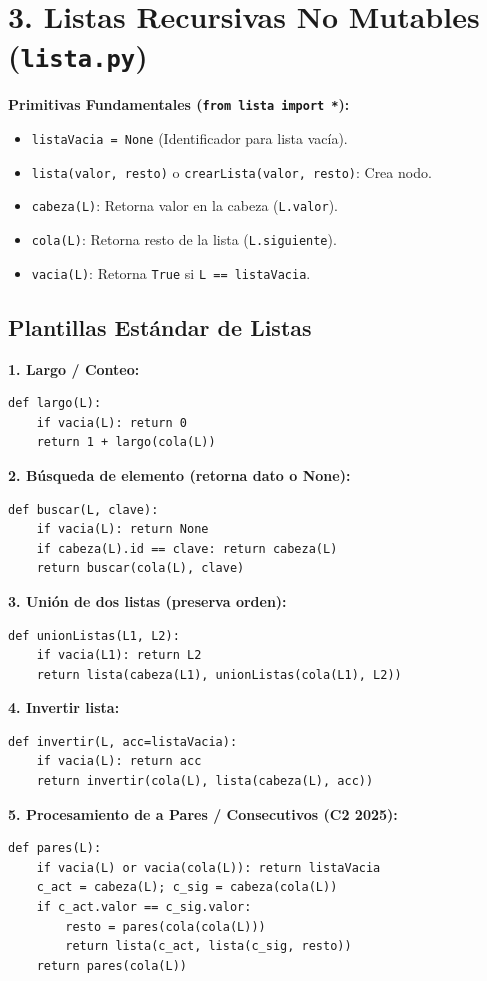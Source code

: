 \documentclass[8pt,twocolumn]{extarticle}
\begin{document}
\section{3. Listas Recursivas No Mutables (\texttt{lista.py})}
\textbf{Primitivas Fundamentales (\texttt{from lista import *}):}
\begin{itemize}
    \item \texttt{listaVacia = None} (Identificador para lista vacía).
    \item \texttt{lista(valor, resto)} o \texttt{crearLista(valor, resto)}: Crea nodo.
    \item \texttt{cabeza(L)}: Retorna valor en la cabeza (\texttt{L.valor}).
    \item \texttt{cola(L)}: Retorna resto de la lista (\texttt{L.siguiente}).
    \item \texttt{vacia(L)}: Retorna \texttt{True} si \texttt{L == listaVacia}.
\end{itemize}

\subsection{Plantillas Estándar de Listas}
\textbf{1. Largo / Conteo:}
\begin{verbatim}
def largo(L):
    if vacia(L): return 0
    return 1 + largo(cola(L))
\end{verbatim}
\textbf{2. Búsqueda de elemento (retorna dato o None):}
\begin{verbatim}
def buscar(L, clave):
    if vacia(L): return None
    if cabeza(L).id == clave: return cabeza(L)
    return buscar(cola(L), clave)
\end{verbatim}
\textbf{3. Unión de dos listas (preserva orden):}
\begin{verbatim}
def unionListas(L1, L2):
    if vacia(L1): return L2
    return lista(cabeza(L1), unionListas(cola(L1), L2))
\end{verbatim}
\textbf{4. Invertir lista:}
\begin{verbatim}
def invertir(L, acc=listaVacia):
    if vacia(L): return acc
    return invertir(cola(L), lista(cabeza(L), acc))
\end{verbatim}
\textbf{5. Procesamiento de a Pares / Consecutivos (C2 2025):}
\begin{verbatim}
def pares(L):
    if vacia(L) or vacia(cola(L)): return listaVacia
    c_act = cabeza(L); c_sig = cabeza(cola(L))
    if c_act.valor == c_sig.valor:
        resto = pares(cola(cola(L)))
        return lista(c_act, lista(c_sig, resto))
    return pares(cola(L))
\end{verbatim}
\end{document}
